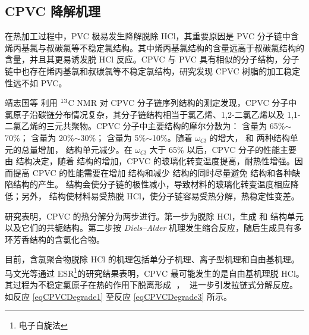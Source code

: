 \subsection{CPVC 降解机理}
在热加工过程中，PVC 极易发生降解脱除 HCl，其重要原因是 PVC 分子链中含烯丙基氯与叔碳氯等不稳定氯结构\cite{15}。其中烯丙基氯结构的含量远高于叔碳氯结构的含量，并且其更易诱发脱 HCl 反应。CPVC 与 PVC 具有相似的分子结构，分子链中也存在烯丙基氯和叔碳氯等不稳定氯结构，研究发现 CPVC 树脂的加工稳定性远不如 PVC\cite{6}。\par
\setatomsep{1.5em}
靖志国等 \cite{4} 利用 $\rm{^{13}}$C NMR 对 CPVC 分子链序列结构的测定发现，CPVC 分子中氯原子沿碳链分布情况复杂，其分子链结构相当于氯乙烯、1,2-二氯乙烯以及 1,1-二氯乙烯的三元共聚物。CPVC 分子中主要结构的摩尔分数为： 含量为 65\%$\sim$70\%； 含量为 20\%$\sim$30\%； 含量为 5\%$\sim$10\%。随着 $\omega_{Cl}$ 的增大， 和  两种结构单元的总量增加， 结构单元减少。在 $\omega_{Cl}$ 大于 65\% 以后，CPVC 分子的性能主要由   结构决定，随着   结构的增加，CPVC 的玻璃化转变温度提高，耐热性增强。因而提高 CPVC 的性能需要在增加  结构和减少  结构的同时尽量避免  结构和各种缺陷结构的产生。 结构会使分子链的极性减小，导致材料的玻璃化转变温度相应降低；另外， 结构使材料易受热脱 HCl，使分子链容易受热分解，热稳定性变差。\par

研究表明，CPVC 的热分解分为两步进行\cite{12}。第一步为脱除 HCl，生成  和  结构单元以及它们的共轭结构。第二步按 \textit{Diels–Alder} 机理发生缩合反应，随后生成具有多环芳香结构的含氯化合物。\par
目前，含氯聚合物脱除 HCl 的机理包括单分子机理、离子型机理和自由基机理。马文光等\cite{22}通过 ESR\footnote{电子自旋法}的研究结果表明，CPVC 最可能发生的是自由基机理脱 HCl。其过程为不稳定氯原子在热的作用下脱离形成 $\;$，$\;$ 进一步引发拉链式分解反应。如反应 \eqref{eqCPVCDegrade1} 至反应 \eqref{eqCPVCDegrade3} 所示。

\setpolymerdelim[]
\setatomsep{2em}

